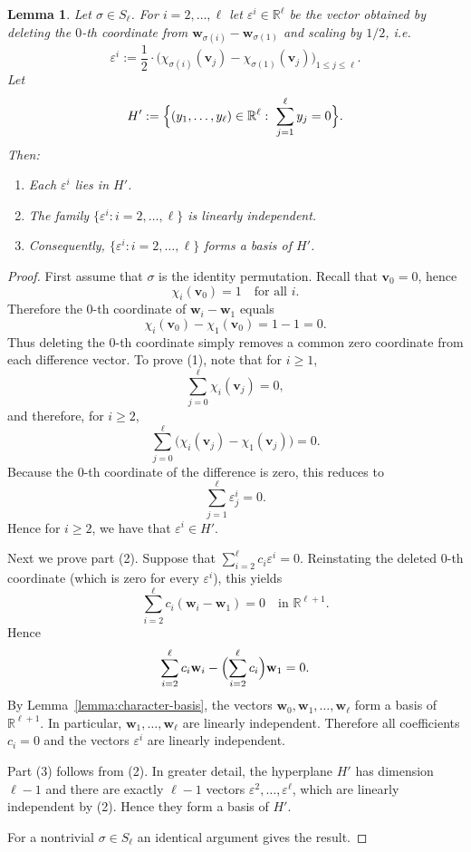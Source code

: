\documentclass{amsart}
\newcommand{\R}{\mathbb{R}}
\theoremstyle{plain}
\newtheorem{lemma}[theorem]{Lemma}
\theoremstyle{definition}
\theoremstyle{remark}
\numberwithin{equation}{section}
\begin{document}
\begin{lemma}\label{lemma:difference-basis}
Let $\sigma\in S_\ell$. For $i=2, \dots, \ell$ let $\varepsilon^i\in \R^\ell$ be the vector obtained by
deleting the $0$-th coordinate from $\mathbf w_{\sigma(i)}-\mathbf w_{\sigma(1)}$ and scaling by $1/2$, i.e.
\[
\varepsilon^i
:=
\frac{1}{2}\cdot\bigl(
\chi_{\sigma(i)}(\mathbf v_j)-\chi_{\sigma(1)}(\mathbf v_j)
\bigr)_{1\le j\le \ell}.
\]
Let
\[
H'
:=
\Bigl\{
(y_1,\dots,y_\ell)\in\R^\ell
:\ \sum_{j=1}^\ell y_j=0
\Bigr\}.
\]
Then:
\begin{enumerate}
\item Each $\varepsilon^i$ lies in $H'$.

\item The family $\{\varepsilon^i : i=2,\dots,\ell\}$
is linearly independent.

\item Consequently,
$\{\varepsilon^i : i=2,\dots,\ell\}$
forms a basis of $H'$.
\end{enumerate}
\end{lemma}

\begin{proof}
First assume that $\sigma$ is the identity permutation. Recall that $\mathbf v_0=0$, hence
\[
\chi_i(\mathbf v_0)=1
\quad\text{for all } i.
\]
Therefore the $0$-th coordinate of $\mathbf w_i-\mathbf w_1$ equals
\[
\chi_i(\mathbf v_0)-\chi_1(\mathbf v_0)=1-1=0.
\]
Thus deleting the $0$-th coordinate simply removes a common zero
coordinate from each difference vector. To prove (1), note that for $i\geq 1$,
\[
\sum_{j=0}^\ell \chi_i(\mathbf v_j)=0,
\]
and therefore, for $i\geq 2$,
\[
\sum_{j=0}^\ell
\bigl(
\chi_i(\mathbf v_j)-\chi_1(\mathbf v_j)
\bigr)=0.
\]
Because the $0$-th coordinate of the difference is zero,
this reduces to
\[
\sum_{j=1}^\ell \varepsilon^i_j=0.
\]
Hence for $i\geq 2$, we have that $\varepsilon^i\in H'$.
\par Next we prove part (2). Suppose that $\sum_{i=2}^\ell c_i \varepsilon^i=0$. Reinstating the deleted $0$-th coordinate (which is zero for every
$\varepsilon^i$), this yields
\[
\sum_{i=2}^\ell c_i(\mathbf w_i-\mathbf w_1)=0
\quad
\text{in }\R^{\ell+1}.
\]
Hence
\[
\sum_{i=2}^\ell c_i \mathbf w_i
-
\Bigl(\sum_{i=2}^\ell c_i\Bigr)\mathbf w_1
=
0.
\]
By Lemma~\ref{lemma:character-basis}, the vectors
$\mathbf w_0,\mathbf w_1,\dots,\mathbf w_\ell$
form a basis of $\R^{\ell+1}$.
In particular, $\mathbf w_1,\dots,\mathbf w_\ell$
are linearly independent.
Therefore all coefficients $c_i=0$ and the vectors $\varepsilon^i$ are linearly independent.
\par Part (3) follows from (2). In greater detail, the hyperplane $H'$ has dimension $\ell-1$ and there are exactly $\ell-1$ vectors
$\varepsilon^2,\dots,\varepsilon^\ell$,
which are linearly independent by (2).
Hence they form a basis of $H'$.
\par For a nontrivial $\sigma\in S_\ell$ an identical argument gives the result.
\end{proof}
\end{document}
